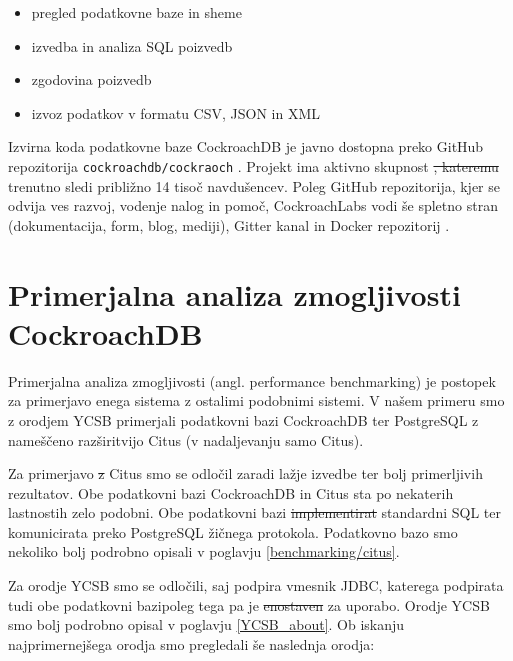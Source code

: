 \documentclass[a4paper, 12pt]{book}
\providecommand{\DIFaddtex}[1]{{\protect\color{blue}\uwave{#1}}} %
\providecommand{\DIFdeltex}[1]{{\protect\color{red}\sout{#1}}}                      %
\providecommand{\DIFaddbegin}{} %
\providecommand{\DIFaddend}{} %
\providecommand{\DIFdelbegin}{} %
\providecommand{\DIFdelend}{} %
\providecommand{\DIFadd}[1]{\texorpdfstring{\DIFaddtex{#1}}{#1}} %
\providecommand{\DIFdel}[1]{\texorpdfstring{\DIFdeltex{#1}}{}} %
\newcommand{\DIFscaledelfig}{0.5}
\newlength{\DIFdelgraphicswidth} %
\newlength{\DIFdelgraphicsheight} %
\newcommand{\DIFaddincludegraphics}[2][]{{\color{blue}\fbox{\DIFOincludegraphics[#1]{#2}}}} %
\newcommand{\DIFdelincludegraphics}[2][]{%
\sbox{\DIFdelgraphicsbox}{\DIFOincludegraphics[#1]{#2}}%
\settoboxwidth{\DIFdelgraphicswidth}{\DIFdelgraphicsbox} %
\settoboxtotalheight{\DIFdelgraphicsheight}{\DIFdelgraphicsbox} %
\scalebox{\DIFscaledelfig}{%
\parbox[b]{\DIFdelgraphicswidth}{\usebox{\DIFdelgraphicsbox}\\[-\baselineskip] \rule{\DIFdelgraphicswidth}{0em}}\llap{\resizebox{\DIFdelgraphicswidth}{\DIFdelgraphicsheight}{%
\setlength{\unitlength}{\DIFdelgraphicswidth}%
\begin{picture}(1,1)%
\thicklines\linethickness{2pt} %
{\color[rgb]{1,0,0}\put(0,0){\framebox(1,1){}}}%
{\color[rgb]{1,0,0}\put(0,0){\line( 1,1){1}}}%
{\color[rgb]{1,0,0}\put(0,1){\line(1,-1){1}}}%
\end{picture}%
}\hspace*{3pt}}} %
} %
\DeclareRobustCommand{\DIFaddbegin}{\DIFOaddbegin \let\includegraphics\DIFaddincludegraphics} %
\DeclareRobustCommand{\DIFaddend}{\DIFOaddend \let\includegraphics\DIFOincludegraphics} %
\DeclareRobustCommand{\DIFdelbegin}{\DIFOdelbegin \let\includegraphics\DIFdelincludegraphics} %
\DeclareRobustCommand{\DIFdelend}{\DIFOaddend \let\includegraphics\DIFOincludegraphics} %
\begin{document}
\begin{itemize}
    \item pregled podatkovne baze in sheme\DIFaddbegin \DIFadd{;
    }\DIFaddend \item izvedba in analiza SQL poizvedb\DIFaddbegin \DIFadd{;
    }\DIFaddend \item zgodovina poizvedb\DIFaddbegin \DIFadd{;
    }\DIFaddend \item izvoz podatkov v formatu CSV, JSON in XML\DIFaddbegin \DIFadd{.
}\DIFaddend \end{itemize}

Izvirna koda podatkovne baze CockroachDB je javno dostopna preko GitHub repozitorija \texttt{cockroachdb/cockraoch} \cite{cockroachdb/cockroach}. Projekt ima aktivno skupnost \DIFdelbegin \DIFdel{, kateremu }\DIFdelend \DIFaddbegin \DIFadd{in mu }\DIFaddend trenutno sledi približno 14 tisoč navdušencev. Poleg GitHub repozitorija, kjer se odvija ves razvoj, vodenje nalog in pomoč, CockroachLabs vodi še spletno stran \cite{CRDB-home} (dokumentacija, form, blog, mediji), Gitter kanal \cite{CRDB-gitter} in Docker repozitorij \cite{CRDB-docker}.

\chapter{Primerjalna analiza zmogljivosti CockroachDB}

Primerjalna analiza zmogljivosti (angl. performance benchmarking) je postopek za primerjavo enega sistema z ostalimi podobnimi sistemi. V našem primeru smo z orodjem YCSB primerjali podatkovni bazi CockroachDB ter PostgreSQL z nameščeno razširitvijo Citus (v nadaljevanju samo Citus). 

Za primerjavo \DIFdelbegin \DIFdel{z }\DIFdelend \DIFaddbegin \DIFadd{s }\DIFaddend Citus smo se odločil zaradi lažje izvedbe ter bolj primerljivih rezultatov. Obe podatkovni bazi CockroachDB in Citus sta po nekaterih lastnostih zelo podobni. Obe podatkovni bazi \DIFdelbegin \DIFdel{implementirat }\DIFdelend \DIFaddbegin \DIFadd{implementirata }\DIFaddend standardni SQL ter komunicirata preko PostgreSQL žičnega protokola. Podatkovno bazo smo nekoliko bolj podrobno opisali v poglavju \ref{benchmarking/citus}.

Za orodje YCSB smo se odločili, saj podpira vmesnik JDBC, katerega podpirata tudi obe podatkovni bazi\DIFaddbegin \DIFadd{, }\DIFaddend poleg tega pa je \DIFdelbegin \DIFdel{enostaven }\DIFdelend \DIFaddbegin \DIFadd{enostavno }\DIFaddend za uporabo. Orodje YCSB smo bolj podrobno opisal v poglavju \ref{YCSB_about}. Ob iskanju najprimernejšega orodja smo pregledali še naslednja orodja:
\end{document}

